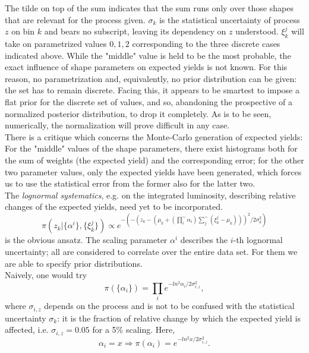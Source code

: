 \documentclass[aps,prb,twocolumn,showpacs,superscriptaddress,groupedaddress]{revtex4}  %
\begin{document}
The tilde on top of the sum indicates that the sum runs only over those shapes that are relevant for the process given. $\sigma_{k}$ is the statistical uncertainty of process $z$ on bin $k$ and bears no subscript, leaving its dependency on $z$ understood. $\xi_{k}^{j}$ will take on parametrized values $0,1,2$ corresponding to the three discrete cases indicated above. While the "middle" value is held to be the most probable, the exact influence of shape parameters on expected yields is not known. For this reason, no parametrization and, equivalently, no prior distribution can be given: the set has to remain discrete. Facing this, it appears to be smartest to impose a flat prior for the discrete set of values, and so, abandoning the prospective of a normalized posterior distribution, to drop it completely. As is to be seen, numerically, the normalization will prove difficult in any case.\\
There is a critique which concerns the Monte-Carlo generation of expected yields: For the "middle" values of the shape parameters, there exist histograms both for the sum of weights (the expected yield) and the corresponding error; for the other two parameter values, only the expected yields have been generated, which forces us to use the statistical error from the former also for the latter two.\\
The \emph{lognormal systematics}, e.g. on the integrated luminosity, describing relative changes of the expected yields, need yet to be incorporated.
\begin{equation*}
\pi(z_{k}|\{\alpha^{i}\},\{\xi_{k}^{j}\})\propto e^{-(-(z_{k}-(\mu_{k}+(\prod\limits_{i}^{\sim}\alpha_{i})\sum\limits_{j}^{\sim}(\xi_{k}^{j}-\mu_{k})))^{2}/2\sigma_{k}^{2})}
\end{equation*}
is the obvious ansatz. The scaling parameter $\alpha^{i}$ describes the $i$-th lognormal uncertainty; all are considered to correlate over the entire data set. For them we are able to specify prior distributions.\\
Naively, one would try
\begin{equation*}
\pi(\{\alpha_{i}\})=\prod\limits_{i}e^{-ln^{2}\alpha_{i}/2\sigma_{i,z}^{2}},
\end{equation*}
where $\sigma_{i,z}$ depends on the process and is not to be confused with the statistical uncertainty $\sigma_{k}$: it is the fraction of relative change by which the expected yield is affected, i.e. $\sigma_{i,z}=0.05$ for a 5\% scaling. Here,
\begin{equation*}
\alpha_{i}=x \Rightarrow \pi(\alpha_{i})=e^{-ln^{2}x/2\sigma_{i,z}^{2}}.
\end{equation*}
\end{document}
